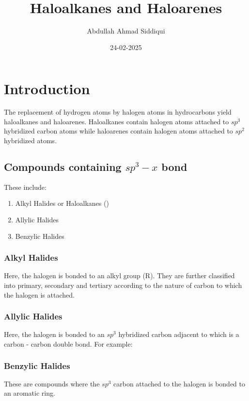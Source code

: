 \documentclass{article}
\title{Haloalkanes and Haloarenes}
\author{Abdullah Ahmad Siddiqui}
\date{24-02-2025}
\begin{document}
\maketitle
\tableofcontents 

\section{Introduction}
The replacement of hydrogen atoms by halogen atoms in hydrocarbons
yield haloalkanes and haloarenes.
Haloalkanes contain halogen atoms attached to $sp^3$
hybridized carbon atoms while haloarenes contain halogen
atoms attached to $sp^2$ hybridized atoms.
\subsection{Compounds containing $sp^3-x$ bond}
These include:
\begin{enumerate}
  \item Alkyl Halides or Haloalkanes ()
  \item{Allylic Halides}
  \item{Benzylic Halides}
\end{enumerate}
\subsubsection{Alkyl Halides}
Here, the halogen is bonded to an alkyl group (R). They are further 
classified into primary, secondary and tertiary according to the
nature of carbon to which the halogen is attached.
\vspace{5mm}

\qquad
{} \qquad{}
\subsubsection{Allylic Halides}
Here, the halogen is bonded to an $sp^3$ hybridized carbon adjacent
to which is a carbon - carbon double bond. For example:
\vspace{5mm}

\vspace{5mm}

\subsubsection{Benzylic Halides}
These are compounds where the $sp^3$ carbon attached to the halogen is bonded
to an aromatic ring.
\vspace{5mm}
\end{document}
